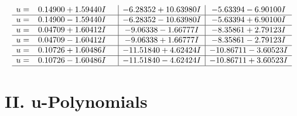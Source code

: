 \documentclass[1p]{elsarticle_modified}
\theoremstyle{definition}
\begin{document}
$$\begin{array}{c|c|c}
\begin{aligned}
u &= \phantom{-}0.14900 + 1.59440 I\end{aligned}
 & -6.28352 + 10.63980 I & -5.63394 - 6.90100 I \\ \hline\begin{aligned}
u &= \phantom{-}0.14900 - 1.59440 I\end{aligned}
 & -6.28352 - 10.63980 I & -5.63394 + 6.90100 I \\ \hline\begin{aligned}
u &= \phantom{-}0.04709 + 1.60412 I\end{aligned}
 & -9.06338 - 1.66777 I & -8.35861 + 2.79123 I \\ \hline\begin{aligned}
u &= \phantom{-}0.04709 - 1.60412 I\end{aligned}
 & -9.06338 + 1.66777 I & -8.35861 - 2.79123 I \\ \hline\begin{aligned}
u &= \phantom{-}0.10726 + 1.60486 I\end{aligned}
 & -11.51840 + 4.62424 I & -10.86711 - 3.60523 I \\ \hline\begin{aligned}
u &= \phantom{-}0.10726 - 1.60486 I\end{aligned}
 & -11.51840 - 4.62424 I & -10.86711 + 3.60523 I\\
 \hline 
 \end{array}$$\newpage
\newpage\renewcommand{\arraystretch}{1}
\centering \section*{ II. u-Polynomials}
\end{document}
